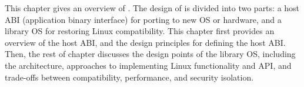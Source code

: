 This chapter gives an overview of \graphene{}.
The design of \graphene{} is divided into two parts:
a host ABI (application binary interface) for porting to new OS or hardware,
and a library OS for restoring Linux compatibility.
This chapter first provides an overview of the host ABI, and the design principles for defining the host ABI.
Then, the rest of chapter
discusses the design points of the library OS, including the architecture,
approaches to implementing Linux functionality and API,
and trade-offs between compatibility, performance, and security isolation.


